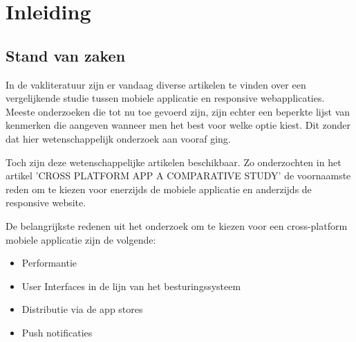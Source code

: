 
\chapter{Inleiding}
\label{ch:inleiding}



\section{Stand van zaken}
\label{sec:stand-van-zaken}

In de vakliteratuur zijn er vandaag diverse artikelen te vinden over een vergelijkende studie tussen mobiele applicatie
en responsive webapplicaties. Meeste onderzoeken die tot nu toe gevoerd zijn, zijn echter een beperkte lijst van kenmerken die aangeven wanneer men het best voor welke optie kiest.
Dit zonder dat hier wetenschappelijk onderzoek aan vooraf ging.

Toch zijn deze wetenschappelijke artikelen beschikbaar. Zo onderzochten \cite{albuquerque2015}
in het artikel 'CROSS PLATFORM APP A COMPARATIVE STUDY' de voornaamste reden om te kiezen voor enerzijds de mobiele
applicatie en anderzijds de responsive website.

De belangrijkste redenen uit het onderzoek om te kiezen voor een cross-platform mobiele applicatie zijn de volgende:
\begin{itemize}
  \item{Performantie}
  \item{User Interfaces in de lijn van het besturingssysteem}
  \item{Distributie via de app stores}
  \item{Push notificaties}
\end{itemize}

